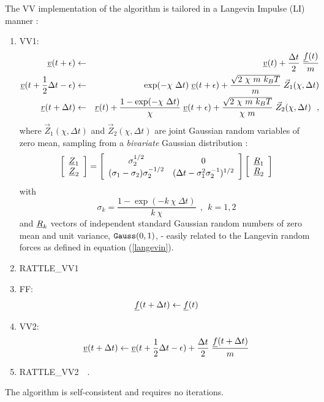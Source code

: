 The VV implementation of the algorithm is tailored in a Langevin
Impulse (LI) manner \cite{izaguirre-01a}:
\begin{enumerate}
\item VV1:
\begin{eqnarray}
\mbox{$\underline{v}$}(t + \epsilon) &\leftarrow& \mbox{$\underline{v}$}(t) +
{\Delta t \over 2} \; {\mbox{$\underline{f}$}(t) \over m} \nonumber \\
\mbox{$\underline{v}$}(t + {1 \over 2} \Delta t - \epsilon) &\leftarrow&
\exp(-\chi~\Delta t) \; \mbox{$\underline{v}$}(t + \epsilon) +
\frac{\sqrt{2~\chi~m~k_{B}T}}{m} \; \vec{Z}_{1}(\chi , \Delta t) \\
\mbox{$\underline{r}$}(t + \Delta t) &\leftarrow& \mbox{$\underline{r}$}(t) +
\frac{1-\exp(-\chi~\Delta t)}{\chi} \; \mbox{$\underline{v}$}(t + \epsilon) +
\frac{\sqrt{2~\chi~m~k_{B}T}}{\chi~m} \;
\vec{Z}_{2}(\chi , \Delta t)~~, \nonumber
\end{eqnarray}
where $\vec{Z}_{1}(\chi , \Delta t)$ and $\vec{Z}_{2}(\chi , \Delta
t)$ are joint Gaussian random variables of zero mean, sampling from
a {\em bivariate} Gaussian distribution \cite{izaguirre-01a}:
\begin{equation}
\left[
  \begin{array}{c}
    \mbox{$\underline{Z}$}_{1} \\
    \mbox{$\underline{Z}$}_{2} \\
  \end{array}
\right]
=
\left[
  \begin{array}{cc}
    \sigma_{2}^{1/2} & 0 \\
    (\sigma_{1} - \sigma_{2})\sigma_{2}^{-1/2} & (\Delta t - \sigma_{1}^{2}\sigma_{2}^{-1})^{1/2} \\
  \end{array}
\right]
\left[
  \begin{array}{c}
    \mbox{$\underline{R}$}_{1} \\
    \mbox{$\underline{R}$}_{2} \\
  \end{array}
\right]
\end{equation}
with
\begin{equation}
\sigma_{k} = \frac{1 - \exp(-k~\chi~\Delta t)}{k~\chi}~~,~~k=1,2
\end{equation}
and $\mbox{$\underline{R}$}_{k}$ vectors of independent standard Gaussian random
numbers of zero mean and unit variance, ${\tt Gauss}(0,1)$, -
easily related to the Langevin random forces as defined in equation (\ref{langevin}).
\item RATTLE\_VV1
\item FF:
\begin{equation}
\mbox{$\underline{f}$}(t + \Delta t) \leftarrow \mbox{$\underline{f}$}(t)
\end{equation}
\item VV2:
\begin{equation}
\mbox{$\underline{v}$}(t + \Delta t) \leftarrow \mbox{$\underline{v}$}(t + {1 \over 2} \Delta t - \epsilon) +
{\Delta t \over 2} \; {\mbox{$\underline{f}$}(t + \Delta t) \over m}
\end{equation}
\item RATTLE\_VV2~~.
\end{enumerate}
The algorithm is self-consistent and requires no iterations.

